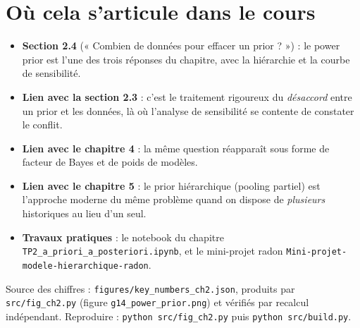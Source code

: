 \documentclass[11pt,a4paper]{article}
\begin{document}
\section{Où cela s'articule dans le cours}

\begin{itemize}
  \item \textbf{Section 2.4} (« Combien de données pour effacer un prior ? ») : le power
        prior est l'une des trois réponses du chapitre, avec la hiérarchie et la courbe
        de sensibilité.
  \item \textbf{Lien avec la section 2.3} : c'est le traitement rigoureux du
        \emph{désaccord} entre un prior et les données, là où l'analyse de sensibilité
        se contente de constater le conflit.
  \item \textbf{Lien avec le chapitre 4} : la même question réapparaît sous forme de
        facteur de Bayes et de poids de modèles.
  \item \textbf{Lien avec le chapitre 5} : le prior hiérarchique (pooling partiel) est
        l'approche moderne du même problème quand on dispose de \emph{plusieurs}
        historiques au lieu d'un seul.
  \item \textbf{Travaux pratiques} : le notebook du chapitre
        \texttt{TP2\_a\_priori\_}\allowbreak\texttt{a\_posteriori.ipynb}, et le mini-projet
        radon \texttt{Mini-projet-modele-}\allowbreak\texttt{hierarchique-radon}.
\end{itemize}

\enlargethispage{3\baselineskip}
\vspace{4pt}
{\footnotesize\color{gris}
Source des chiffres : \texttt{figures/key\_numbers\_ch2.json}, produits par
\texttt{src/fig\_ch2.py} (figure \texttt{g14\_power\_prior.png}) et vérifiés par recalcul
indépendant. Reproduire : \texttt{python src/fig\_ch2.py} puis
\texttt{python src/build.py}.}
\end{document}
